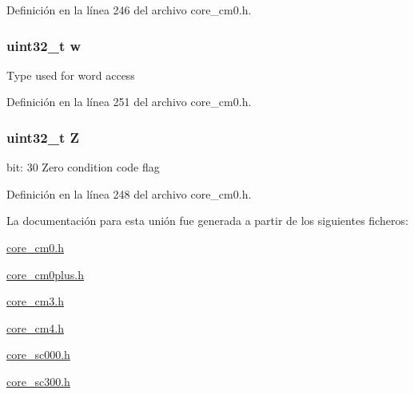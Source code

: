 Definición en la línea 246 del archivo core\+\_\+cm0.\+h.

\subsubsection[{\texorpdfstring{w}{w}}]{\setlength{\rightskip}{0pt plus 5cm}uint32\+\_\+t w}\hypertarget{unionx_p_s_r___type_ad0fb62e7a08e70fc5e0a76b67809f84b}{}\label{unionx_p_s_r___type_ad0fb62e7a08e70fc5e0a76b67809f84b}
Type used for word access 

Definición en la línea 251 del archivo core\+\_\+cm0.\+h.

\subsubsection[{\texorpdfstring{Z}{Z}}]{\setlength{\rightskip}{0pt plus 5cm}uint32\+\_\+t Z}\hypertarget{unionx_p_s_r___type_a5ae954cbd9986cd64625d7fa00943c8e}{}\label{unionx_p_s_r___type_a5ae954cbd9986cd64625d7fa00943c8e}
bit\+: 30 Zero condition code flag 

Definición en la línea 248 del archivo core\+\_\+cm0.\+h.



La documentación para esta unión fue generada a partir de los siguientes ficheros\+:\begin{DoxyCompactItemize}
\item 
\hyperlink{core__cm0_8h}{core\+\_\+cm0.\+h}\item 
\hyperlink{core__cm0plus_8h}{core\+\_\+cm0plus.\+h}\item 
\hyperlink{core__cm3_8h}{core\+\_\+cm3.\+h}\item 
\hyperlink{core__cm4_8h}{core\+\_\+cm4.\+h}\item 
\hyperlink{core__sc000_8h}{core\+\_\+sc000.\+h}\item 
\hyperlink{core__sc300_8h}{core\+\_\+sc300.\+h}\end{DoxyCompactItemize}
